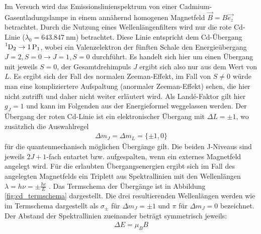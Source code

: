 Im Versuch wird das Emissionslinienspektrum von einer Cadmium-Gasentladungslampe in einem annähernd homogenen Magnetfeld $\vec{B}=B\vec{e_z}$ betrachtet. Durch die Nutzung eines Wellenlängenfilters wird nur die rote Cd-Linie ($\lambda_0=\SI{643.847}{\nano\meter}$) betrachtet. Diese Linie entspricht dem Cd-Übergang $\ce{^1D_2} \to \ce{1P_1}$, wobei ein Valenzelektron der fünften Schale den Energieübergang $J=2, S=0 \to J=1, S=0$ durchführt. Es handelt sich hier um einen Übergang mit jeweils $S=0$, der Gesamtdrehimpuls $J$ ergibt sich also nur aus dem Wert von $L$. Es ergibt sich der Fall des normalen Zeeman-Effekt, im Fall von $S\not=0$ würde man eine kompliziertere Aufspaltung (anormaler Zeeman-Effekt) sehen, die hier nicht zutrifft und daher nicht weiter erläutert wird. Als Landé-Faktor gilt hier $g_J=1$ und kann im Folgenden aus der Energieformel weggelassen werden.
Der Übergang der roten Cd-Linie ist ein elektronischer Übergang mit $\Delta L = \pm 1$, wo zusätzlich die Auswahlregel
\begin{align}\label{eq:auswahlregel}
	\Delta m_J=\Delta m_L=\{\pm 1,0\}
\end{align}
für die quantenmechanisch möglichen Übergänge gilt. Die beiden J-Niveaus sind jeweils $2J+1$-fach entartet bzw. aufgespalten, wenn ein externes Magnetfeld angelegt wird. Für die erlaubten Übergangsenergien ergibt sich im Fall des angelegten Magnetfelds ein Triplett aus Spektrallinien mit den Wellenlängen $\lambda = h\nu = \pm \frac{hc}{E}$ \cite{LDzeeman}. Das Termschema der Übergänge ist in Abbildung \ref{fig:cd_termschema} dargestellt. Die drei resultierenden Wellenlängen werden wie im Termschema dargestellt als $\sigma_\pm$ für $\Delta m_J=\pm 1$ und $\pi$ für $\Delta m_J=0$ bezeichnet. Der Abstand der Spektrallinien zueinander beträgt symmetrisch jeweils:
\begin{align} \label{eq:energieabstand}
	\Delta E = \mu_B B
\end{align}


